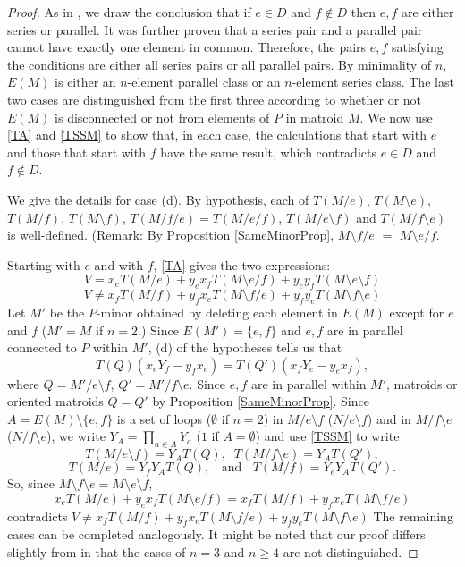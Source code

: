 \documentclass[12pt,leqno]{amsart}
\theoremstyle{remark}
\begin{document}
\begin{proof}
As in  \cite{Ellis-Monaghan-Traldi}, we draw the conclusion that
if $e\in D$ and $f\not\in D$ then $e, f$ are either series or parallel. 
It was further proven that a series pair and a parallel pair cannot
have exactly one element in common.  Therefore, the pairs $e,f$ satisfying 
the conditions are either all series pairs or all parallel pairs.  By 
minimality of $n$, $E(M)$ is either an $n$-element parallel class or an 
$n$-element series class.  The last two cases are distinguished from
the first three according to whether or not $E(M)$ is disconnected or not
from elements of $P$ in matroid $M$.  We now use \eqref{TA} and \eqref{TSSM}
to show that, in each case, the calculations that start with $e$ and 
those that start with $f$
have the same result, which contradicts $e\in D$ and $f\not\in D$.

We give the details for case (d).  By hypothesis, 
each of $T(M/e)$, $T(M\setminus e)$, $T(M/f)$, $T(M\setminus f)$,
$T(M/f/e)=T(M/e/f)$, $T(M/e\setminus f)$ and 
$T(M/f\setminus e)$ is well-defined.  (Remark:
By Proposition \ref{SameMinorProp},
$M\setminus f/e$ $=$ 
$M\setminus e/f$.  

Starting with $e$ and with $f$, \eqref{TA} gives the two expressions:
\[
V= x_e T(M/e) + y_e x_f T(M\setminus e /f) + y_e y_f T(M\setminus e\setminus f)
\]
\[
V\neq 
   x_f T(M/f) + y_f x_e T(M\setminus f /e) + y_f y_e T(M\setminus f\setminus e)
\]
Let $M'$ be the $P$-minor obtained by deleting each element
in $E(M)$ except for $e$ and $f$ ($M'=M$ if $n=2$.)
Since 
$E(M')=\{e,f\}$ and $e,f$ are in parallel connected to $P$ within
$M'$, (d) of the hypotheses  tells us that
\[
T(Q) (x_e Y_f - y_f x_e) =
T(Q') (x_f Y_e - y_e x_f ),
\]
where $Q=M'/e \setminus f$, $Q'=M'/f \setminus e$.  
Since $e,f$ are in parallel within $M'$,
matroids
or oriented matroids $Q=Q'$ by Proposition \ref{SameMinorProp}.
Since $A=E(M)\setminus\{e,f\}$ is a set of loops ($\emptyset$ if $n=2$)
in
$M/e\setminus f$ ($N/e\setminus f$) and 
in $M/f\setminus e$ ($N/f\setminus e$), we 
write $Y_A=\prod_{a\in A}Y_a$ ($1$ if $A=\emptyset$)
and use \eqref{TSSM} to write
\[
T(M/e\setminus f) = Y_A T(Q ),\;\;
T(M/f\setminus e) = Y_A T(Q' ),
\]
\[
T(M/e) = Y_f Y_A T(Q ),\;\;\text{ and }\;\;
T(M/f) = Y_e Y_A T(Q' ).
\]
So, since $M\setminus f\setminus e=M\setminus e\setminus f$,
\[
x_e T(M/e) + y_e x_f T(M\setminus e /f)
=
x_f T(M/f) + y_f x_e T(M\setminus f /e)
\]
contradicts 
$V\neq 
x_f T(M/f) + y_f x_e T(M\setminus f /e) + y_f y_e T(M\setminus f\setminus e)$
The remaining cases can be completed analogously.  It might be
noted that our proof differs slightly from \cite{Ellis-Monaghan-Traldi}
in that the cases of $n=3$ and $n\ge 4$ are not distinguished.
\end{proof}
\end{document}
